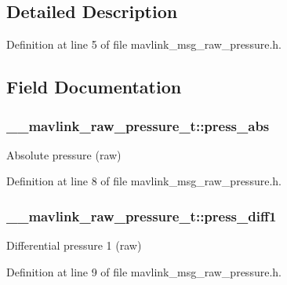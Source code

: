 \subsection{Detailed Description}


Definition at line 5 of file mavlink\-\_\-msg\-\_\-raw\-\_\-pressure.\-h.



\subsection{Field Documentation}
\hypertarget{struct____mavlink__raw__pressure__t_aab16fd5b27c766d69df4ffa252d573e3}{
\subsubsection[{press\-\_\-abs}]{ \-\_\-\-\_\-mavlink\-\_\-raw\-\_\-pressure\-\_\-t\-::press\-\_\-abs}}\label{struct____mavlink__raw__pressure__t_aab16fd5b27c766d69df4ffa252d573e3}


Absolute pressure (raw) 



Definition at line 8 of file mavlink\-\_\-msg\-\_\-raw\-\_\-pressure.\-h.

\hypertarget{struct____mavlink__raw__pressure__t_ae53766b9335fa7900b3a72daca467b70}{
\subsubsection[{press\-\_\-diff1}]{ \-\_\-\-\_\-mavlink\-\_\-raw\-\_\-pressure\-\_\-t\-::press\-\_\-diff1}}\label{struct____mavlink__raw__pressure__t_ae53766b9335fa7900b3a72daca467b70}


Differential pressure 1 (raw) 



Definition at line 9 of file mavlink\-\_\-msg\-\_\-raw\-\_\-pressure.\-h.

